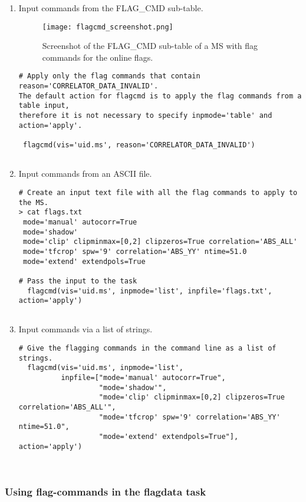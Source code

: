 \begin{enumerate}
\item Input commands from the FLAG\_CMD sub-table. 

\begin{figure}
\texttt{[image: flagcmd\_screenshot.png]}
\caption{Screenshot of the FLAG\_CMD sub-table of a MS with flag commands for the
online flags. }
\end{figure}

\begin{verbatim}
# Apply only the flag commands that contain reason='CORRELATOR_DATA_INVALID'.
The default action for flagcmd is to apply the flag commands from a table input,
therefore it is not necessary to specify inpmode='table' and action='apply'.

 flagcmd(vis='uid.ms', reason='CORRELATOR_DATA_INVALID')
  
\end{verbatim}

\item Input commands from an ASCII file.
\begin{verbatim}
# Create an input text file with all the flag commands to apply to the MS.
> cat flags.txt
 mode='manual' autocorr=True
 mode='shadow'
 mode='clip' clipminmax=[0,2] clipzeros=True correlation='ABS_ALL'
 mode='tfcrop' spw='9' correlation='ABS_YY' ntime=51.0
 mode='extend' extendpols=True

# Pass the input to the task
  flagcmd(vis='uid.ms', inpmode='list', inpfile='flags.txt', action='apply')
 
\end{verbatim}

\item Input commands via a list of strings.
\begin{verbatim}
# Give the flagging commands in the command line as a list of strings.
  flagcmd(vis='uid.ms', inpmode='list',
          inpfile=["mode='manual' autocorr=True",
                   "mode='shadow'",
                   "mode='clip' clipminmax=[0,2] clipzeros=True correlation='ABS_ALL'", 
                   "mode='tfcrop' spw='9' correlation='ABS_YY' ntime=51.0",
                   "mode='extend' extendpols=True"], action='apply')
 
 
\end{verbatim}
\end{enumerate}

\subsubsection{Using flag-commands in the flagdata task}

